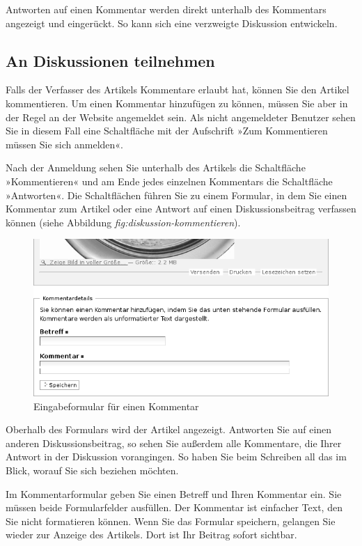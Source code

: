 \documentclass[a4paper,12pt,ngerman]{manual}
\begin{document}
Antworten auf einen Kommentar werden direkt unterhalb des Kommentars
angezeigt und eingerückt. So kann sich eine verzweigte Diskussion
entwickeln.


\subsection{An Diskussionen teilnehmen}

Falls der Verfasser des Artikels Kommentare erlaubt hat, können Sie
den Artikel kommentieren. Um einen Kommentar hinzufügen zu können,
müssen Sie aber in der Regel an der Website angemeldet sein. Als nicht
angemeldeter Benutzer sehen Sie in diesem Fall eine Schaltfläche mit
der Aufschrift »Zum Kommentieren müssen Sie sich anmelden«.

Nach der Anmeldung sehen Sie unterhalb des Artikels die Schaltfläche
»Kommentieren« und am Ende jedes einzelnen Kommentars die Schaltfläche
»Antworten«. Die Schaltflächen führen Sie zu einem Formular, in dem Sie
einen Kommentar zum Artikel oder eine Antwort auf einen Diskussionsbeitrag
verfassen können (siehe Abbildung \emph{fig:diskussion-kommentieren}).
\hypertarget{fig-diskussion-kommentieren}{}\begin{figure}[htbp]
\centering

\includegraphics{diskussion-kommentieren.png}
\caption{Eingabeformular für einen Kommentar}\end{figure}

Oberhalb des Formulars wird der Artikel angezeigt. Antworten Sie auf einen
anderen Diskussionsbeitrag, so sehen Sie außerdem alle Kommentare, die Ihrer
Antwort in der Diskussion vorangingen. So haben Sie beim Schreiben all das im
Blick, worauf Sie sich beziehen möchten.

Im Kommentarformular geben Sie einen Betreff und Ihren Kommentar ein. Sie
müssen beide Formularfelder ausfüllen. Der Kommentar ist einfacher Text, den
Sie nicht formatieren können. Wenn Sie das Formular speichern, gelangen Sie
wieder zur Anzeige des Artikels. Dort ist Ihr Beitrag sofort sichtbar.
\end{document}
